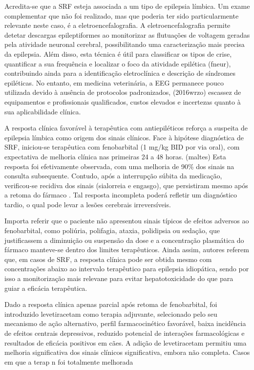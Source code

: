 Acredita-se que a SRF esteja associada a um tipo de epilepsia límbica. Um exame complementar que não foi realizado, mas que poderia ter sido particularmente relevante neste caso, é a eletroencefalografia. A eletroencefalografia permite detetar descargas epileptiformes ao monitorizar as flutuações de voltagem geradas pela atividade neuronal cerebral, \cite{Wang2025} possibilitando uma caracterização mais precisa da epilepsia. \cite{Lyon2024} Além disso, esta técnica é útil para classificar os tipos de crise, quantificar a sua frequência e localizar o foco da atividade epilética (fneur), contribuindo ainda para a identificação eletroclínica e descrição de síndromes epiléticas. \cite{Lyon2024} No entanto, em medicina veterinária, a EEG permanece pouco utilizada devido à ausência de protocolos padronizados, (2016wrzo) escassez de equipamentos e profissionais qualificados, custos elevados e incertezas quanto à sua aplicabilidade clínica. \cite{Everest2024}\cite{Luca2023}


A resposta clínica favorável à terapêutica com antiepiléticos reforça a suspeita  de epilepsia límbica como origem dos sinais clínicos. Face à hipótese diagnóstica de SRF, iniciou-se terapêutica com fenobarbital (1 mg/kg BID por via oral), com expectativa de melhoria clínica nas primeiras 24 a 48 horas. (maltes) Esta resposta foi efetivamente observada, com uma melhoria de 90\% dos sinais na consulta subsequente. Contudo, após a interrupção súbita da medicação, verificou-se recidiva dos sinais (sialorreia e engasgo), que persistiram mesmo após a retoma do fármaco . Tal resposta incompleta poderá refletir um diagnóstico tardio, o qual pode levar a lesões cerebrais irreversíveis. \cite{Wang2025}


Importa referir que o paciente não apresentou sinais típicos de efeitos adversos ao fenobarbital, como poliúria, polifagia, ataxia, polidipsia ou sedação, que justificassem a diminuição ou suspensão da dose e a concentração plasmática do fármaco manteve-se dentro dos limites terapêuticos. Ainda assim, autores referem que, em casos de SRF, a resposta clínica pode ser obtida mesmo com concentrações abaixo ao intervalo terapêutico para epilepsia idiopática, sendo por isso a monitorização mais relevane para evitar hepatotoxicidade do que para guiar a eficácia terapêutica.


Dado a resposta clínica apenas parcial após retoma de fenobarbital, foi introduzido levetiracetam como terapia adjuvante, selecionado pelo seu mecanismo de ação alternativo, perfil farmacocinético favorável, baixa incidência de efeitos centrais depressivos, reduzido potencial de interações farmacológicas \cite{Deshpande2014} e resultados de eficácia positivos em cães.\cite{ajvr}  A adição de levetiracetam permitiu uma melhoria significativa dos sinais clínicos significativa, embora não completa. Casos em que a terap n foi totalmente melhorada


